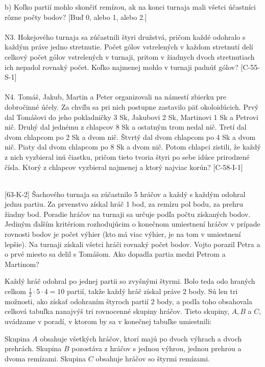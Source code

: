 b) Koľko partií mohlo skončiť remízou, ak na konci turnaja mali všetci účastníci rôzne počty bodov? [Buď 0, alebo 1, alebo 2.]\\
\\
N3. Hokejového turnaja sa zúčastnili štyri družstvá, pričom každé odohralo s každým práve jedno stretnutie. Počet gólov vstrelených v každom stretnutí delí celkový počet gólov vstrelených v turnaji, pritom v žiadnych dvoch stretnutiach ich nepadol rovnaký počet. Koľko najmenej mohlo v turnaji padnúť gólov? [C-55-S-1]\\
\\
N4. Tomáš, Jakub, Martin a Peter organizovali na námestí zbierku pre dobročinné účely. Za chvíľu sa pri nich postupne zastavilo päť okoloidúcich. Prvý dal Tomášovi do jeho pokladničky 3 Sk, Jakubovi 2 Sk, Martinovi 1 Sk a Petrovi nič. Druhý dal jednému z chlapcov 8 Sk a ostatným trom nedal nič. Tretí dal dvom chlapcom po 2 Sk a dvom nič. Štvrtý dal dvom chlapcom po 4 Sk a dvom nič. Piaty dal dvom chlapcom po 8 Sk a dvom nič. Potom chlapci zistili, že každý z nich vyzbieral inú čiastku, pričom tieto tvoria štyri po sebe idúce prirodzené čísla. Ktorý z chlapcov vyzbieral najmenej a ktorý najviac korún? [C-58-I-1]\\
\\
\begin{tcolorbox}[breakable,notitle,boxrule=0pt,colback=light-gray,colframe=light-gray]\ul [63-K-2]
Šachového turnaja sa zúčastnilo 5 hráčov a každý s každým odohral jednu partiu. Za prvenstvo získal hráč 1 bod, za remízu pol bodu, za prehru žiadny bod. Poradie hráčov na turnaji sa určuje podľa počtu získaných bodov. Jediným ďalším kritériom rozhodujúcim o konečnom umiestnení hráčov v prípade rovnosti bodov je počet výhier (kto má viac výhier, je na tom v umiestnení lepšie). Na turnaji získali všetci hráči rovnaký počet bodov. Vojto porazil Petra a o prvé miesto sa delil s Tomášom. Ako dopadla partia
medzi Petrom a Martinom?

\end{tcolorbox}

\rieh Každý hráč odohral po jednej partii so zvyšnými štyrmi. Bolo teda odo hraných celkom $\frac{1}{2}\cdot5 \cdot 4 = 10$ partií, takže každý hráč získal práve 2 body. Sú len tri možnosti, ako získať odohraním štyroch partií 2 body, a podľa toho obsahovala celková tabuľka nanajvýš tri rovnocenné skupiny hráčov. Tieto skupiny, $A, B$ a $C$, uvádzame v poradí, v ktorom by sa v konečnej tabuľke umiestnili:

Skupina $A$ obsahuje všetkých hráčov, ktorí majú po dvoch výhrach a dvoch prehrách. Skupina $B$ pozostáva z hráčov s jednou výhrou, jednou prehrou a dvoma remízami. Skupina $C$ obsahuje hráčov so štyrmi remízami.

